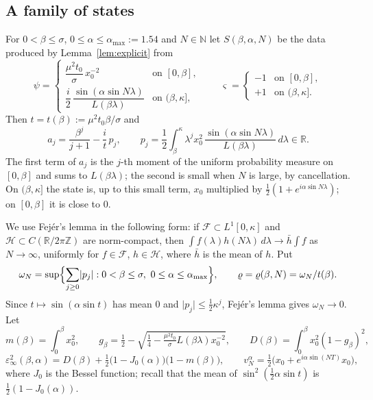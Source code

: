 \documentclass[11pt]{article}
\theoremstyle{definition}
\newcommand{\R}{\mathbb{R}}
\newcommand{\N}{\mathbb{N}}
\newcommand{\abs}[1]{\lvert #1\rvert}
\newcommand{\rhoN}{\varrho}
\begin{document}
\subsection{A family of states}\label{ssec:states}
For $0<\beta\le\sigma$, $0\le\alpha\le\alpha_{\max}:=1.54$ and $N\in\N$ let
$S(\beta,\alpha,N)$ be the data produced by Lemma~\ref{lem:explicit} from
\[
\psi=\begin{cases}\dfrac{\mu^2t_0}{\sigma}\,x_0^{-2}&\text{on }[0,\beta],\\[2ex]
\dfrac i2\,\dfrac{\sin(\alpha\sin N\lambda)}{L(\beta\lambda)}&\text{on }(\beta,\kappa],
\end{cases}
\qquad \varsigma=\begin{cases}-1&\text{on }[0,\beta],\\+1&\text{on }(\beta,\kappa].\end{cases}
\]
Then $t=t(\beta):=\mu^2t_0\beta/\sigma$ and
\begin{equation}\label{eq:aj}
a_j=\frac{\beta^j}{j+1}-\frac{i}{t}\,p_j,\qquad
p_j=\frac12\int_\beta^\kappa\lambda^jx_0^2\,\frac{\sin(\alpha\sin N\lambda)}{L(\beta\lambda)}\,
d\lambda\in\R .
\end{equation}
The first term of $a_j$ is the $j$-th moment of the uniform probability measure on
$[0,\beta]$ and sums to $L(\beta\lambda)$; the second is small when $N$ is large, by
cancellation. On $(\beta,\kappa]$ the state is, up to this small term, $x_0$ multiplied by
$\frac12(1+e^{i\alpha\sin N\lambda})$; on $[0,\beta]$ it is close to $0$.

We use Fej\'er's lemma in the following form: if $\mathcal F\subset L^1[0,\kappa]$ and
$\mathcal H\subset C(\R/2\pi\mathbb Z)$ are norm-compact, then
$\int f(\lambda)h(N\lambda)\,d\lambda\to\bar h\int f$ as $N\to\infty$, uniformly for
$f\in\mathcal F$, $h\in\mathcal H$, where $\bar h$ is the mean of $h$. Put
\[
\omega_N=\sup\Bigl\{\sum_{j\ge0}\abs{p_j}:0<\beta\le\sigma,\ 0\le\alpha\le\alpha_{\max}\Bigr\},
\qquad\rhoN=\rhoN(\beta,N)=\omega_N/t(\beta).
\]
Since $t\mapsto\sin(\alpha\sin t)$ has mean $0$ and $\abs{p_j}\le\frac12\kappa^j$, Fej\'er's
lemma gives $\omega_N\to0$. Let
\[
m(\beta)=\int_0^\beta x_0^2,\qquad
g_\beta=\tfrac12-\sqrt{\tfrac14-\tfrac{\mu^2t_0}{\sigma}L(\beta\lambda)x_0^{-2}},\qquad
D(\beta)=\int_0^\beta x_0^2(1-g_\beta)^2 ,
\]
\[
\varepsilon_\infty^2(\beta,\alpha)=D(\beta)+\tfrac12\bigl(1-J_0(\alpha)\bigr)\bigl(1-m(\beta)\bigr),
\qquad v_N^\alpha=\tfrac12\bigl(x_0+e^{i\alpha\sin(NT)}x_0\bigr),
\]
where $J_0$ is the Bessel function; recall that the mean of $\sin^2(\frac12\alpha\sin t)$ is
$\frac12(1-J_0(\alpha))$.
\end{document}

